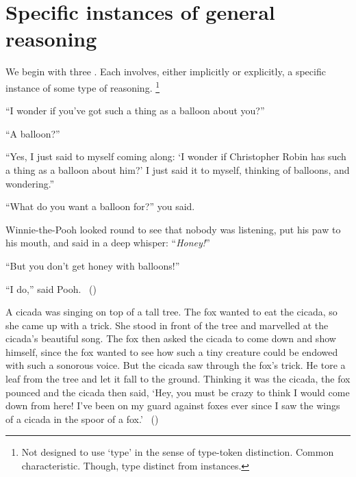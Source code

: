 \section{Specific instances of general reasoning}
\label{cha:typical:sec:g-s}

\begin{note}
  We begin with three .
  Each  involves, either implicitly or explicitly, a specific instance of some type of reasoning.%
  \footnote{
    Not designed to use `type' in the sense of type-token distinction.
    Common characteristic.
    Though, type distinct from instances.
  }
\end{note}

\begin{note}
  \begin{scenario}
    ``I wonder if you've got such a thing as a balloon about you?''

    \noindent%
    ``A balloon?''

    \noindent%
    ``Yes, I just said to myself coming along:
    `I wonder if Christopher Robin has such a thing as a balloon about him?'
    I just said it to myself, thinking of balloons, and wondering.''

    \noindent%
    ``What do you want a balloon for?'' you said.

    \noindent%
    Winnie-the-Pooh looked round to see that nobody was listening, put his paw to his mouth, and said in a deep whisper:
    ``\emph{Honey!}''

    \noindent%
    ``But you don't get honey with balloons!''

    \noindent%
    ``I do,'' said Pooh.%
    \mbox{ }\hfill\mbox{(\cite[12]{Milne:2009aa})}
  \end{scenario}

  \begin{scenario}
    A cicada was singing on top of a tall tree.
    The fox wanted to eat the cicada, so she came up with a trick.
    She stood in front of the tree and marvelled at the cicada's beautiful song.
    The fox then asked the cicada to come down and show himself, since the fox wanted to see how such a tiny creature could be endowed with such a sonorous voice.
    But the cicada saw through the fox's trick.
    He tore a leaf from the tree and let it fall to the ground.
    Thinking it was the cicada, the fox pounced and the cicada then said,
    `Hey, you must be crazy to think I would come down from here! I've been on my guard against foxes ever since I saw the wings of a cicada in the spoor of a fox.'%
    \mbox{ }\hfill\mbox{(\cite[136]{Aesop:2002aa})}
  \end{scenario}


\end{note}
